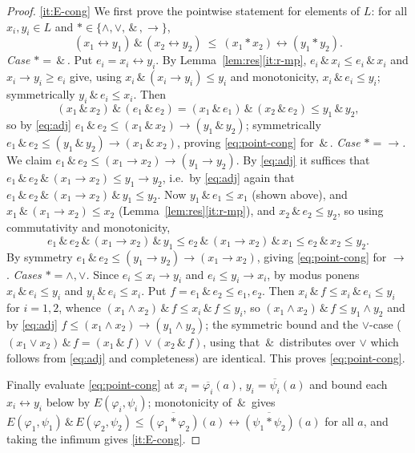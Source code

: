 \documentclass{amsart}
\theoremstyle{definition}
\theoremstyle{plain}
\newcommand{\fto}{\rightarrow}
\newcommand{\fbi}{\leftrightarrow}
\newcommand{\odotop}{\,\&\,}
\begin{document}
\begin{proof}
\eqref{it:E-cong} We first prove the pointwise statement for elements of $L$:
for all $x_i,y_i\in L$ and $*\in\{\wedge,\vee,\odotop,\fto\}$,
\begin{equation}\label{eq:point-cong}
(x_1\fbi y_1)\odotop(x_2\fbi y_2)\ \le\ (x_1*x_2)\fbi(y_1*y_2).
\end{equation}
\emph{Case $*=\odotop$.}  Put $e_i=x_i\fbi y_i$.  By
Lemma~\ref{lem:res}\eqref{it:r-mp}, $e_i\odotop x_i\le e_i\odotop x_i$ and
$x_i\fto y_i\ge e_i$ give, using
$x_i\odotop(x_i\fto y_i)\le y_i$ and monotonicity,
$x_i\odotop e_i\le y_i$; symmetrically $y_i\odotop e_i\le x_i$.  Then
\[
(x_1\odotop x_2)\odotop(e_1\odotop e_2)
=(x_1\odotop e_1)\odotop(x_2\odotop e_2)\le y_1\odotop y_2,
\]
so by \eqref{eq:adj} $e_1\odotop e_2\le (x_1\odotop x_2)\fto(y_1\odotop y_2)$;
symmetrically $e_1\odotop e_2\le(y_1\odotop y_2)\fto(x_1\odotop x_2)$, proving
\eqref{eq:point-cong} for $\odotop$.
\emph{Case $*=\fto$.}  We claim
$e_1\odotop e_2\le(x_1\fto x_2)\fto(y_1\fto y_2)$.  By \eqref{eq:adj} it suffices
that $e_1\odotop e_2\odotop(x_1\fto x_2)\le y_1\fto y_2$, i.e.\ by \eqref{eq:adj}
again that $e_1\odotop e_2\odotop(x_1\fto x_2)\odotop y_1\le y_2$.  Now
$y_1\odotop e_1\le x_1$ (shown above), and $x_1\odotop(x_1\fto x_2)\le x_2$
(Lemma~\ref{lem:res}\eqref{it:r-mp}), and $x_2\odotop e_2\le y_2$, so using
commutativity and monotonicity,
\[
e_1\odotop e_2\odotop(x_1\fto x_2)\odotop y_1
\le e_2\odotop(x_1\fto x_2)\odotop x_1
\le e_2\odotop x_2\le y_2 .
\]
By symmetry $e_1\odotop e_2\le(y_1\fto y_2)\fto(x_1\fto x_2)$, giving
\eqref{eq:point-cong} for $\fto$.
\emph{Cases $*=\wedge,\vee$.}  Since $e_i\le x_i\fto y_i$ and
$e_i\le y_i\fto x_i$, by modus ponens $x_i\odotop e_i\le y_i$ and
$y_i\odotop e_i\le x_i$.  Put $f=e_1\odotop e_2\le e_1,e_2$.  Then
$x_i\odotop f\le x_i\odotop e_i\le y_i$ for $i=1,2$, whence
$(x_1\wedge x_2)\odotop f\le x_i\odotop f\le y_i$, so
$(x_1\wedge x_2)\odotop f\le y_1\wedge y_2$ and by \eqref{eq:adj}
$f\le (x_1\wedge x_2)\fto(y_1\wedge y_2)$; the symmetric bound and the
$\vee$-case ($(x_1\vee x_2)\odotop f=(x_1\odotop f)\vee(x_2\odotop f)$, using that
$\odotop$ distributes over $\vee$ which follows from \eqref{eq:adj} and
completeness) are identical.  This proves \eqref{eq:point-cong}.

Finally evaluate \eqref{eq:point-cong} at $x_i=\overline{\varphi_i}(a)$,
$y_i=\overline{\psi_i}(a)$ and bound each $x_i\fbi y_i$ below by
$E(\varphi_i,\psi_i)$; monotonicity of $\odotop$ gives
$E(\varphi_1,\psi_1)\odotop E(\varphi_2,\psi_2)\le
\overline{(\varphi_1*\varphi_2)}(a)\fbi\overline{(\psi_1*\psi_2)}(a)$ for all
$a$, and taking the infimum gives \eqref{it:E-cong}.
\end{proof}
\end{document}
